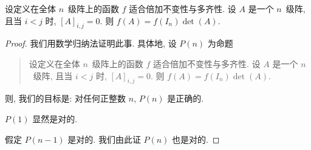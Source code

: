 \begin{theorem}
    设定义在全体 \(n\)~级阵上的函数 \(f\)
    适合倍加不变性与多齐性.
    设 \(A\) 是一个 \(n\)~级阵,
    且当 \(i < j\) 时, \([A]_{i,j} = 0\).
    则 \(f(A) = f(I_n) \det {(A)}\).
\end{theorem}

\begin{proof}
    我们用数学归纳法证明此事.
    具体地, 设 \(P(n)\) 为命题
    \begin{quotation}
        设定义在全体 \(n\)~级阵上的函数 \(f\)
        适合倍加不变性与多齐性.
        设 \(A\) 是一个 \(n\)~级阵,
        且当 \(i < j\) 时, \([A]_{i,j} = 0\).
        则 \(f(A) = f(I_n) \det {(A)}\).
    \end{quotation}
    则, 我们的目标是:
    对任何正整数 \(n\), \(P(n)\) 是正确的.

    \(P(1)\) 显然是对的.

    假定 \(P(n-1)\) 是对的.
    我们由此证 \(P(n)\) 也是对的.


\end{proof}
